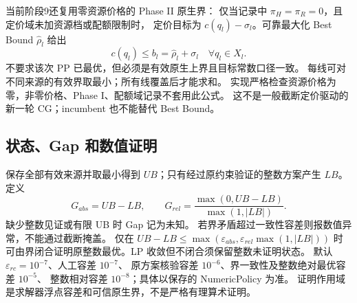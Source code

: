 \documentclass[UTF8,a4paper,11pt]{ctexart}
\begin{document}
当前阶段9还复用零资源价格的 Phase II 原生界：
仅当记录中 $\pi_H=\pi_R=0$，且定价域未加资源档或配额限制时，
定价目标为 $c(q_l)-\sigma_l$。可靠最大化 Best Bound $\widehat\rho_l$ 给出
\begin{equation}
c(q_l)\leq b_l=\widehat\rho_l+\sigma_l\quad\forall q_l\in X_l.
\end{equation}
不要求该次 PP 已最优，但必须是有效原生上界且目标常数口径一致。
每线可对不同来源的有效界取最小；所有线覆盖后才能求和。
实现严格检查资源价格为零，非零价格、Phase I、配额域记录不套用此公式。
这不是一般截断定价驱动的新一轮 CG；incumbent 也不能替代 Best Bound。

\subsection{状态、Gap 和数值证明}
保存全部有效来源并取最小得到 $UB$；只有经过原约束验证的整数方案产生 $LB$。
定义
\begin{equation}
G_{abs}=UB-LB,\qquad G_{rel}=\frac{\max(0,UB-LB)}{\max(1,|LB|)}.
\end{equation}
缺少整数见证或有限 UB 时 Gap 记为未知。
若界矛盾超过一致性容差则报数值异常，不能通过截断掩盖。
仅在 $UB-LB\leq\max(\varepsilon_{abs},\varepsilon_{rel}\max(1,|LB|))$
时可由界闭合证明原整数最优。LP 收敛但不闭合须保留整数未证明状态。
默认 $\varepsilon_{rc}=10^{-7}$、人工容差 $10^{-7}$、
原方案核验容差 $10^{-6}$、界一致性及整数绝对最优容差 $10^{-5}$、
整数相对容差 $10^{-8}$；具体以保存的 NumericPolicy 为准。
证明作用域是求解器浮点容差和可信原生界，不是严格有理算术证明。
\end{document}
